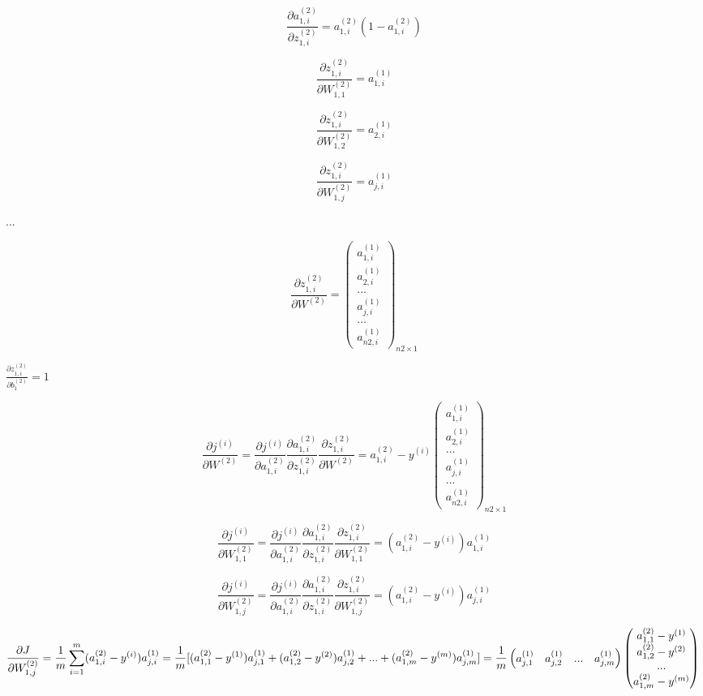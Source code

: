 \documentclass[
]{article}
\begin{document}
\[\frac{\partial{a^{(2)}_{1,i}}}{\partial{z^{(2)}_{1,i}}} = {a^{(2)}_{1,i}(1-a^{(2)}_{1,i})}\]

\[\frac{\partial{z^{(2)}_{1,i}}}{\partial{W^{(2)}_{1,1}}} = {a^{(1)}_{1,i}}\]

\[\frac{\partial{z^{(2)}_{1,i}}}{\partial{W^{(2)}_{1,2}}} = {a^{(1)}_{2,i}}\]

\[\frac{\partial{z^{(2)}_{1,i}}}{\partial{W^{(2)}_{1,j}}} = {a^{(1)}_{j,i}}\]

\(...\)

\[\frac{\partial{z^{(2)}_{1,i}}}{\partial{W^{(2)}}} = {\begin{pmatrix}
  {a^{(1)}_{1,i}} \\
  {a^{(1)}_{2,i}} \\
  ...\\
  {a^{(1)}_{j,i}} \\
  ...\\
  {a^{(1)}_{n2,i}}
\end{pmatrix}}_{n2×1}\]

\(\frac{\partial{z^{(2)}_{1,i}}}{\partial{b^{(2)}_{1}}} = 1\)

\[\frac{\partial{j^{(i)}}}{\partial{W^{(2)}}} = \frac{\partial{j^{(i)}}}{\partial{a^{(2)}_{1,i}}} \frac{\partial{a^{(2)}_{1,i}}}{\partial{z^{(2)}_{1,i}}}\frac{\partial{z^{(2)}_{1,i}}}{\partial{W^{(2)}}} = a^{(2)}_{1,i}-y^{(i)}{\begin{pmatrix}
  {a^{(1)}_{1,i}} \\
  {a^{(1)}_{2,i}} \\
  ...\\
  {a^{(1)}_{j,i}} \\
  ...\\
  {a^{(1)}_{n2,i}}
\end{pmatrix}}_{n2×1}\]

\[\frac{\partial{j^{(i)}}}{\partial{W^{(2)}_{1,1}}} = \frac{\partial{j^{(i)}}}{\partial{a^{(2)}_{1,i}}} \frac{\partial{a^{(2)}_{1,i}}}{\partial{z^{(2)}_{1,i}}}\frac{\partial{z^{(2)}_{1,i}}}{\partial{W^{(2)}_{{1,1}}}} = (a^{(2)}_{1,i}-y^{(i)}){a^{(1)}_{1,i}}\]

\[\frac{\partial{j^{(i)}}}{\partial{W^{(2)}_{1,j}}} = \frac{\partial{j^{(i)}}}{\partial{a^{(2)}_{1,i}}} \frac{\partial{a^{(2)}_{1,i}}}{\partial{z^{(2)}_{1,i}}}\frac{\partial{z^{(2)}_{1,i}}}{\partial{W^{(2)}_{{1,j}}}} = (a^{(2)}_{1,i}-y^{(i)}){a^{(1)}_{j,i}}\]

\[\frac{\partial{J}}{\partial{W^{(2)}_{1,j}}} = \frac{1}{m}\sum_{i=1}^{m}(a^{(2)}_{1,i}-y^{(i)}){a^{(1)}_{j,i}} \\
= \frac{1}{m}[(a^{(2)}_{1,1}-y^{(1)})a^{(1)}_{j,1} + (a^{(2)}_{1,2}-y^{(2)})a^{(1)}_{j,2} + ... + (a^{(2)}_{1,m}-y^{(m)})a^{(1)}_{j,m}]\\
= \frac{1}{m} \begin{pmatrix}
  a^{(1)}_{j,1}  & a^{(1)}_{j,2} & ... & a^{(1)}_{j,m}
\end{pmatrix} \begin{pmatrix}
  a^{(2)}_{1,1}-y^{(1)}\\
  a^{(2)}_{1,2}-y^{(2)}\\
  ...\\
  a^{(2)}_{1,m}-y^{(m)}\\
\end{pmatrix}\\\]
\end{document}
